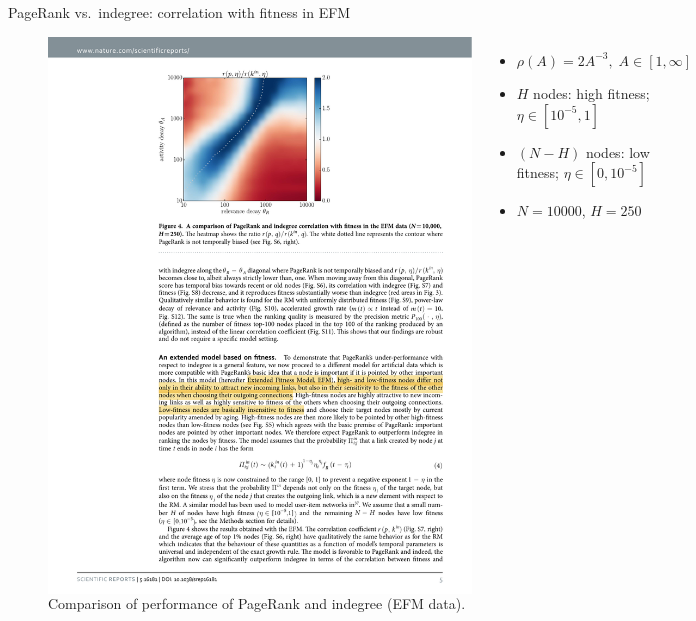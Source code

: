 \begin{frame}{PageRank vs.\ indegree: correlation with fitness in EFM}
    \begin{figure}
        \begin{columns}

            \includegraphics[width=1.0\textwidth]{figures/PageRankEFM_heatmap}

            \begin{footnotesize}
            \begin{itemize}
                \item $\rho(A) = 2A^{-3}, \; A \in [1, \infty]$
                \item $H$ nodes: high fitness; $\eta \in [10^{-5}, 1]$
                \item $(N-H)$ nodes: low fitness; $\eta \in [0, 10^{-5}]$
                \item $N=10000$, $H=250$
            \end{itemize}
            \end{footnotesize}
        \end{columns}
        \caption{Comparison of performance of PageRank and indegree (EFM data).}
    \end{figure}
\end{frame}
